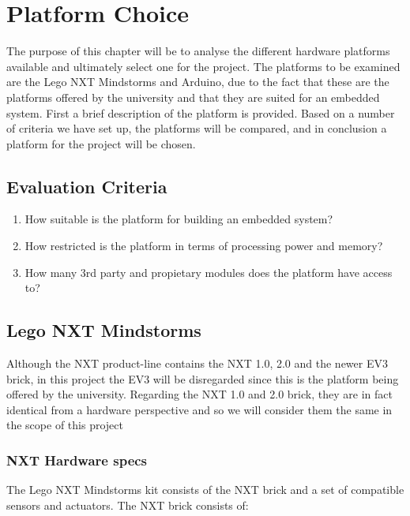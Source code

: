 \chapter{Platform Choice}\label{PlatformC}
The purpose of this chapter will be to analyse the different hardware platforms available
and ultimately select one for the project. The platforms to be examined are the
Lego NXT Mindstorms and Arduino, due to the fact that these are the
platforms offered by the university and that they are suited for an embedded
system.
First a brief description of the platform is provided. Based on a number of criteria
 we have set up, the platforms will be compared, and in conclusion a
platform for the project will be chosen.

\section{Evaluation Criteria}

\begin{enumerate}
  \item How suitable is the platform for building an embedded system?
  \item How restricted is the platform in terms of processing power and memory?
  \item How many 3rd party and propietary modules does the platform have access
  to?
\end{enumerate}

\section{Lego NXT Mindstorms}
 Although the NXT product-line contains the NXT 1.0,
2.0 and the newer EV3 brick, in this project the EV3 will be disregarded since this is the platform being offered by the
university. Regarding the NXT 1.0 and 2.0 brick, they are in fact identical from a
hardware perspective and so we will consider them the same in the scope of this
project \Source \nl

\subsection{NXT Hardware specs}
The Lego NXT Mindstorms kit consists of the NXT brick and a set of
compatible sensors and actuators. The NXT brick \citep[P.70]{NXTStats} consists
of:

